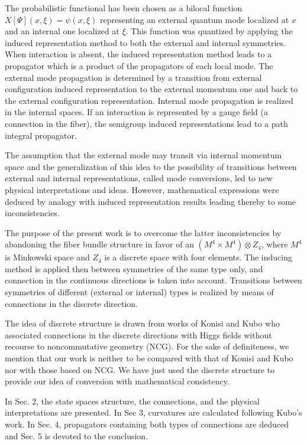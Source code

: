 \documentclass[12pt,a4paper]{article}
\begin{document}
The probabilistic functional has been chosen as a bilocal function
$X[\Psi](x,\xi)=\psi(x,\xi)$ representing an external quantum mode localized
at $x$ and an internal one localized at $\xi$. This function was quantized by
applying the induced representation method to both the external and internal
symmetries. When interaction is absent, the induced representation method
leads to a propagator which is a product of the propagators of each local
mode. The external mode propagation is determined by a transition from
external configuration induced representation to the external momentum one and
back to the external configuration representation. Internal mode propagation
is realized in the internal spaces. If an interaction is represented by a
gauge field (a connection in the fiber), the semigroup induced representations
lead to a path integral propagator.\cite{Mensky 1983, Smida 1998}

The assumption that the external mode may transit via internal momentum space
and the generalization of this idea to the possibility of transitions between
external and internal representations, called mode conversions, led to new
physical interpretations and ideas. However, mathematical expressions were
deduced by analogy with induced representation results leading thereby to some
inconsistencies.\cite{Smida 2000}

The purpose of the present work is to overcome the latter inconsistencies by
abandoning the fiber bundle structure in favor of an $\left(  M^{4}\times
M^{4}\right)  \otimes Z_{4}$, where $M^{4}$ is Minkowski space and $Z_{4}$ is
a discrete space with four elements. The inducing method is applied then
between symmetries of the same type only, and connection in the continuous
directions is taken into account. Transitions between symmetries of different
(external or internal) types is realized by means of connections in the
discrete direction.

The idea of discrete structure is drawn from works of Konisi\cite{Konisi 1996}
and Kubo\cite{Kubo 1998} who associated connections in the discrete directions
with Higgs fields without recourse to noncommutative geometry (NCG). For the
sake of definiteness, we mention that our work is neither to be compared with
that of Konisi and Kubo nor with those based on NCG. We have just used the
discrete structure to provide our idea of conversion with mathematical consistency.

In Sec. 2, the state spaces structure, the connections, and the physical
interpretations are presented. In Sec 3, curvatures are calculated following
Kubo's work.\cite{Kubo 1998} In Sec. 4, propagators containing both types of
connections are deduced and Sec. 5 is devoted to the conclusion.
\end{document}

